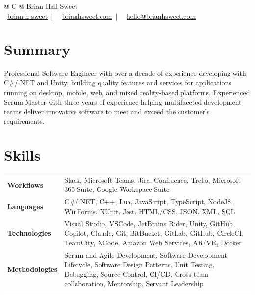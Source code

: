 \documentclass[letterpaper,9pt]{extarticle}
\begin{document}
\pagestyle{empty} 


\begin{tabularx}{\linewidth}{@{} C @{}}
\huge{Brian Hall Sweet} \\ [5pt]
\raisebox{-0.00\height}\faLinkedin\ \href{https://linkedin.com/in/brian-h-sweet}{\underline{brian-h-sweet}}\ $|$ \
\raisebox{-0.05\height}\faGlobe\ \href{https://www.brianhsweet.com}{\underline{brianhsweet.com}}\ $|$ \
\raisebox{-0.05\height}\faEnvelope\ \href{mailto:hello@brianhsweet.com}{\underline{hello@brianhsweet.com}}
\end{tabularx}


\section{Summary}
Professional Software Engineer with over a decade of experience developing with C\#/.NET and \href{https://unity.com/}{\underline{Unity}}, building quality features and services for applications running on desktop, mobile, web, and mixed reality-based platforms. Experienced Scrum Master with three years of experience helping multifaceted development teams deliver innovative software to meet and exceed the customer's requirements.

\section{Skills}
\begin{tabularx}{\linewidth}{@{}l X@{}} 
\textbf{Workflows} & Slack, Microsoft Teams, Jira, Confluence, Trello, Microsoft 365 Suite, Google Workspace Suite\\
\textbf{Languages} & C\#/.NET, C++, Lua, JavaScript, TypeScript, NodeJS, WinForms, NUnit, Jest, HTML/CSS, JSON, XML, SQL\\
\textbf{Technologies} & Visual Studio, VSCode, JetBrains Rider, Unity, GitHub Copilot, Claude, Git, BitBucket, GitLab, GitHub, CircleCI, TeamCity, XCode, Amazon Web Services, AR/VR, Docker\\ 
\textbf{Methodologies} & Scrum and Agile Development, Software Development Lifecycle, Software Design Patterns, Unit Testing, Debugging, Source Control, CI/CD, Cross-team collaboration, Mentorship, Servant Leadership\\
\end{tabularx}
\end{document}
